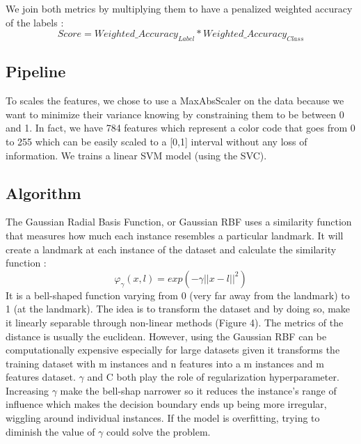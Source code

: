 We join both metrics by multiplying them to have a penalized weighted accuracy of the labels : 
\begin{equation*}
	Score  = Weighted\_Accuracy_{Label} *  Weighted\_Accuracy_{Class}
\end{equation*}



\subsection{Pipeline}
To scales the features, we chose to use a MaxAbsScaler on the data because we want to minimize their variance knowing by constraining them to be between 0 and 1. In fact, we have 784 features which represent a color code that goes from 0 to 255 which can be easily scaled to a [0,1] interval without any loss of information. We trains a linear SVM model (using the SVC). 

\subsection{Algorithm}
The Gaussian Radial Basis Function, or Gaussian RBF uses a similarity function that measures how much each instance resembles a particular landmark. It will create a landmark at each instance of the dataset and calculate the similarity function :  
\begin{equation} \varphi_\gamma(x,l)= exp (-\gamma ||x-l||^2) \end{equation}
It is a bell-shaped function varying from 0 (very far away from the landmark) to 1 (at the landmark). The idea is to transform the dataset and by doing so, make it linearly separable through non-linear methods (Figure 4).
The metrics of the distance is usually the euclidean.
However, using the Gaussian RBF can be computationally expensive especially for large datasets given it transforms the training dataset with m instances and n features into a m instances and m features dataset.
$\gamma$ and C both play the role of regularization hyperparameter. Increasing $\gamma$ make the bell-shap narrower so it reduces the instance's range of influence which makes the decision boundary ends up being more irregular, wiggling around individual instances.
If the model is overfitting, trying to diminish the value of $\gamma$ could solve the problem.